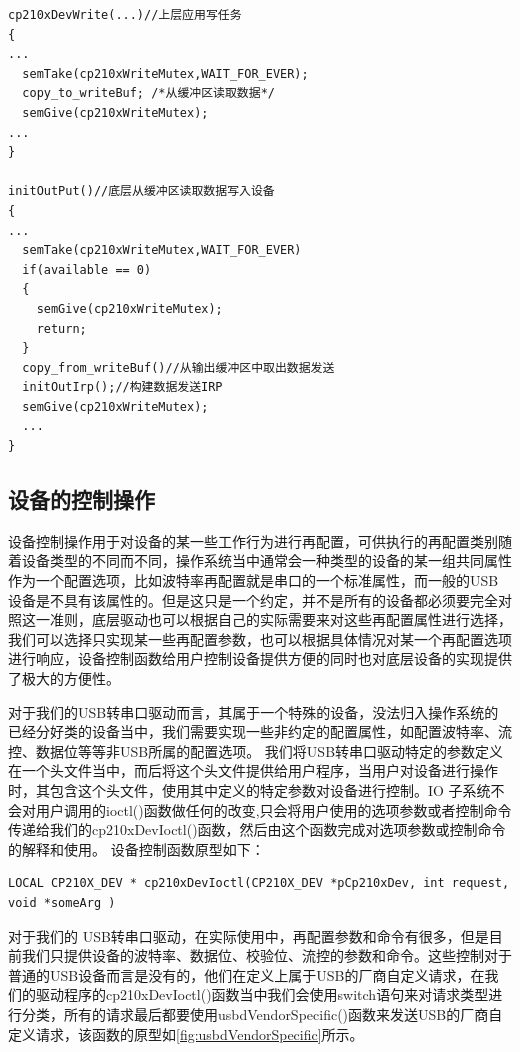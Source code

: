 \lstset{language=C}
\begin{lstlisting}
cp210xDevWrite(...)//上层应用写任务
{
...	
  semTake(cp210xWriteMutex,WAIT_FOR_EVER);
  copy_to_writeBuf; /*从缓冲区读取数据*/
  semGive(cp210xWriteMutex);
...
}

initOutPut()//底层从缓冲区读取数据写入设备
{
...
  semTake(cp210xWriteMutex,WAIT_FOR_EVER)
  if(available == 0)
  {
	semGive(cp210xWriteMutex);
	return;
  }	
  copy_from_writeBuf()//从输出缓冲区中取出数据发送
  initOutIrp();//构建数据发送IRP
  semGive(cp210xWriteMutex);
  ...
}
\end{lstlisting}  





\subsection{设备的控制操作}
	设备控制操作用于对设备的某一些工作行为进行再配置，可供执行的再配置类别随着设备类型的不同而不同，操作系统当中通常会一种类型的设备的某一组共同属性作为一个配置选项，比如波特率再配置就是串口的一个标准属性，而一般的USB设备是不具有该属性的。但是这只是一个约定，并不是所有的设备都必须要完全对照这一准则，底层驱动也可以根据自己的实际需要来对这些再配置属性进行选择，我们可以选择只实现某一些再配置参数，也可以根据具体情况对某一个再配置选项进行响应，设备控制函数给用户控制设备提供方便的同时也对底层设备的实现提供了极大的方便性。
	
	对于我们的USB转串口驱动而言，其属于一个特殊的设备，没法归入操作系统的已经分好类的设备当中，我们需要实现一些非约定的配置属性，如配置波特率、流控、数据位等等非USB所属的配置选项。
	我们将USB转串口驱动特定的参数定义在一个头文件当中，而后将这个头文件提供给用户程序，当用户对设备进行操作时，其包含这个头文件，使用其中定义的特定参数对设备进行控制。IO 子系统不会对用户调用的ioctl()函数做任何的改变,只会将用户使用的选项参数或者控制命令传递给我们的cp210xDevIoctl()函数，然后由这个函数完成对选项参数或控制命令的解释和使用。
设备控制函数原型如下：
\lstset{language=C}
\begin{lstlisting}
LOCAL CP210X_DEV * cp210xDevIoctl(CP210X_DEV *pCp210xDev, int request, void *someArg )
\end{lstlisting}

对于我们的 USB转串口驱动，在实际使用中，再配置参数和命令有很多，但是目前我们只提供设备的波特率、数据位、校验位、流控的参数和命令。这些控制对于普通的USB设备而言是没有的，他们在定义上属于USB的厂商自定义请求，在我们的驱动程序的cp210xDevIoctl()函数当中我们会使用switch语句来对请求类型进行分类，所有的请求最后都要使用usbdVendorSpecific()函数来发送USB的厂商自定义请求，该函数的原型如\autoref{fig:usbdVendorSpecific}所示。


